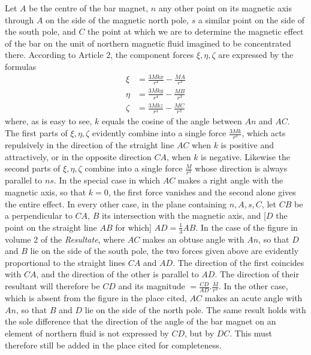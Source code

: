 Let $A$ be the centre of the bar magnet, $n$ any other point on its magnetic axis through $A$ on the side of the magnetic north pole, $s$ a similar point on the side of the south pole, and $C$ the point at which we are to determine the magnetic effect of the bar on the unit of northern magnetic fluid imagined to be concentrated there. According to Article 2, the component forces $\xi,\eta,\zeta$ are expressed by the formulas
\[
\begin{aligned}
\xi&=\frac{3Mkx}{r^4}-\frac{MA}{r^3}\\
\eta&=\frac{3Mky}{r^4}-\frac{MB}{r^3}\\
\zeta&=\frac{3Mkz}{r^4}-\frac{MC}{r^3}
\end{aligned}
\]
where, as is easy to see, $k$ equals the cosine of the angle between $An$ and $AC$. The first parts of $\xi,\eta,\zeta$ evidently combine into a single force $\frac{3Mk}{r^3}$, which acts repulsively in the direction of the straight line $AC$ when $k$ is positive and attractively, or in the opposite direction $CA$, when $k$ is negative. Likewise the second parts of $\xi,\eta,\zeta$ combine into a single force $\frac{M}{r^3}$ whose direction is always parallel to $ns$. In the special case in which $AC$ makes a right angle with the magnetic axis, so that $k=0$, the first force vanishes and the second alone gives the
entire effect. In every other case, in the plane containing $n,A,s,C$, let $CB$ be a perpendicular to $CA$, $B$ its intersection with the magnetic axis, and [$D$ the point on the straight line $AB$ for which] $AD=\tfrac13AB$. In the case of the figure in volume 2 of the \textit{Resultate}, where $AC$ makes an obtuse angle with $An$, so that $D$ and $B$ lie on the side of the south pole, the two forces given above are evidently proportional to the straight lines $CA$ and $AD$. The direction of the first coincides with $CA$, and the direction of the other is parallel to $AD$. The direction of their resultant will therefore be $CD$ and its magnitude $=\frac{CD}{AD}.\frac{M}{r^3}$. In the other case, which is absent from the figure in the place cited, $AC$ makes an acute angle with $An$, so that $B$ and $D$ lie on the side of the north pole. The same result holds with the sole difference that the direction of the angle of the bar magnet on an element of northern fluid is not expressed by $CD$, but by $DC$. This must therefore still be added in the place cited for completeness.

